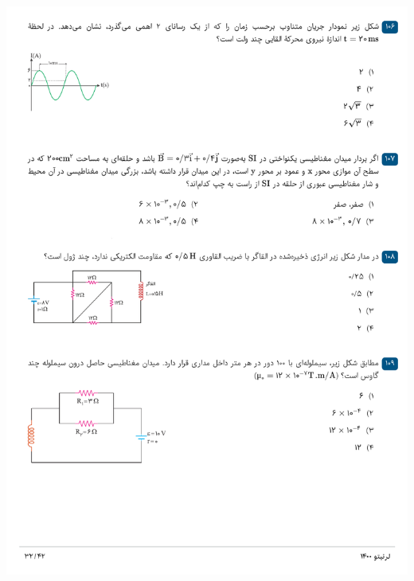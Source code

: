 \documentclass{book}
\begin{document}
\includegraphics[width=\textwidth]{"pages/32"}
\end{document}
